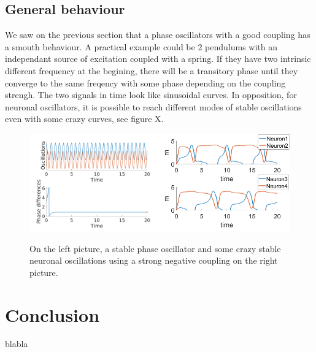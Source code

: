 \documentclass[a4paper]{scrartcl}
\begin{document}
\subsection{General behaviour}

We saw  on the previous section that a phase oscillators with a good coupling has a smouth behaviour. A practical example could be 2 pendulums with an independant source of excitation coupled with a spring. If they have two intrinsic different frequency at the begining, there will be a transitory phase until they converge to the same freqency with some phase depending on the coupling strengh. The two signals in time look like sinusoidal curves. In opposition, for neuronal oscillators, it is possible to reach different modes of stable oscillations even with some crazy curves, see figure X.

\begin{figure}[!h]
	\centering
	\includegraphics[width=0.5\textwidth]{fig/2phase.png}\includegraphics[width=0.5\textwidth]{fig/crazy.png}
	\caption{On the left picture, a stable phase oscillator and some crazy stable neuronal oscillations using a strong negative coupling on the right picture.}
\end{figure}


\newpage
\section{Conclusion}

blabla
\end{document}
